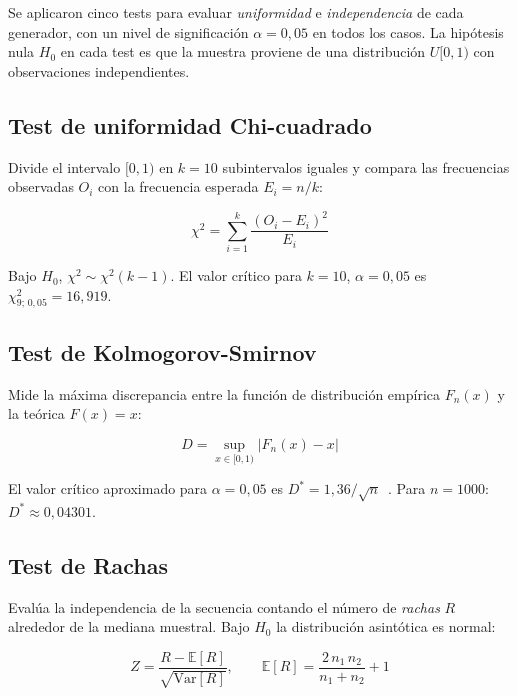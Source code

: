 \documentclass{article}
\begin{document}
Se aplicaron cinco tests para evaluar \emph{uniformidad} e
\emph{independencia} de cada generador, con un nivel de significación
$\alpha = 0{,}05$ en todos los casos.  La hipótesis nula $H_0$ en cada test
es que la muestra proviene de una distribución $U[0,1)$ con observaciones
independientes.

\subsection{Test de uniformidad Chi-cuadrado}

Divide el intervalo $[0,1)$ en $k=10$ subintervalos iguales y compara las
frecuencias observadas $O_i$ con la frecuencia esperada $E_i = n/k$:

\begin{equation}
  \chi^2 = \sum_{i=1}^{k} \frac{(O_i - E_i)^2}{E_i}
  \label{eq:chi2}
\end{equation}

Bajo $H_0$, $\chi^2 \sim \chi^2(k-1)$.  El valor crítico para
$k=10$, $\alpha=0{,}05$ es $\chi^2_{9;\,0{,}05} = 16{,}919$.

\subsection{Test de Kolmogorov-Smirnov}

Mide la máxima discrepancia entre la función de distribución empírica
$F_n(x)$ y la teórica $F(x)=x$:

\begin{equation}
  D = \sup_{x \in [0,1)} \left| F_n(x) - x \right|
  \label{eq:ks}
\end{equation}

El valor crítico aproximado para $\alpha=0{,}05$ es
$D^* = 1{,}36/\sqrt{n}$~\cite{massey1951}.
Para $n=1000$: $D^* \approx 0{,}04301$.

\subsection{Test de Rachas}

Evalúa la independencia de la secuencia contando el número de
\emph{rachas} $R$ alrededor de la mediana muestral.  Bajo $H_0$ la
distribución asintótica es normal:

\begin{equation}
  Z = \frac{R - \mathbb{E}[R]}{\sqrt{\mathrm{Var}[R]}},\qquad
  \mathbb{E}[R] = \frac{2\,n_1\,n_2}{n_1+n_2}+1
  \label{eq:rachas}
\end{equation}
\end{document}
